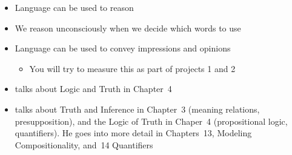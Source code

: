 \documentclass[a4paper,landscape,headrule,footrule,xetex]{foils}
\begin{document}
\begin{itemize}
\item Language can be used to reason
\item We reason unconsciously when we decide which words to use
\item Language can be used to convey impressions and opinions
  \begin{itemize}
  \item You will try to measure this as part of projects 1 and 2
  \end{itemize}
\item \citet{Saeed:2015} talks about Logic and Truth in Chapter~4
\item  \citet{Kroeger:2022} talks about Truth and Inference in Chapter~3 (meaning relations, presupposition), and the Logic of Truth in Chaper~4 (propositional logic, quantifiers).  He goes into more detail in Chapters~13, Modeling Compositionality, and~14 Quantifiers  
\end{itemize}


\small



\end{document}
